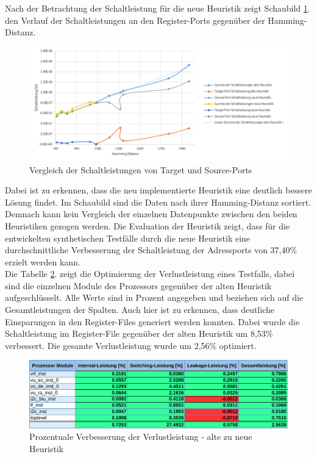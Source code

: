 Nach der Betrachtung der Schaltleistung für die neue Heuristik zeigt Schaubild \ref{fig:heuristic_schaltleistung_alt_neu}. den Verlauf der Schaltleistungen an den Register-Ports gegenüber der Hamming-Distanz. 

\begin{figure}[H]
	\centering
	\includegraphics[width=\textwidth]{fig/heuristik_schaltleistung_alt_neu.pdf}
	\caption{Vergleich der Schaltleistungen von Target und Source-Ports}
	\label{fig:heuristic_schaltleistung_alt_neu}
\end{figure}

Dabei ist zu erkennen, dass die neu implementierte Heuristik eine deutlich bessere Lösung findet. Im Schaubild sind die Daten nach ihrer Hamming-Distanz sortiert. Demnach kann kein Vergleich der einzelnen Datenpunkte zwischen den beiden Heuristiken gezogen werden. 
Die Evaluation der Heuristik zeigt, dass für die entwickelten synthetischen Testfälle durch die neue Heuristik eine durchschnittliche Verbesserung der Schaltleistung der Adressports von 37,40\% erzielt werden kann.\\
Die Tabelle \ref{fig:compare_power_heuristic}. zeigt die Optimierung der Verlustleistung eines Testfalls, dabei sind die einzelnen Module des Prozessors gegenüber der alten Heuristik aufgeschlüsselt. Alle Werte sind in Prozent angegeben und beziehen sich auf die Gesamtleistungen der Spalten. Auch hier ist zu erkennen, dass deutliche Einsparungen in den Register-Files generiert werden konnten. Dabei wurde die Schaltleistung im Register-File gegenüber der alten Heuristik um 8,53\% verbessert. Die gesamte Verlustleistung wurde um 2,56\% optimiert. 

\begin{figure}[H]
	\centering
	\includegraphics[width=\textwidth]{fig/compare_power_heuristic.pdf}
	\caption{Prozentuale Verbesserung der Verlustleistung - alte zu neue Heuristik}
	\label{fig:compare_power_heuristic}
\end{figure}



